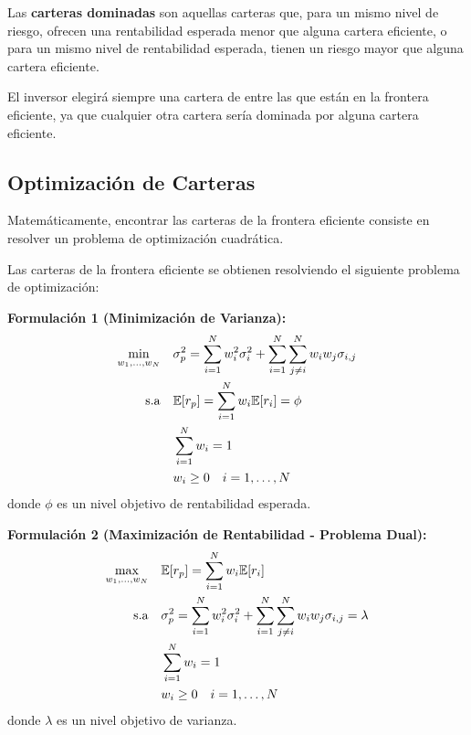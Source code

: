\begin{definicion}
Las \textbf{carteras dominadas} son aquellas carteras que, para un mismo nivel de riesgo, ofrecen una rentabilidad esperada menor que alguna cartera eficiente, o para un mismo nivel de rentabilidad esperada, tienen un riesgo mayor que alguna cartera eficiente.
\end{definicion}

El inversor elegirá siempre una cartera de entre las que están en la frontera eficiente, ya que cualquier otra cartera sería dominada por alguna cartera eficiente.

\subsection{Optimización de Carteras}

Matemáticamente, encontrar las carteras de la frontera eficiente consiste en resolver un problema de optimización cuadrática.

\begin{teorema}
Las carteras de la frontera eficiente se obtienen resolviendo el siguiente problema de optimización:

\textbf{Formulación 1 (Minimización de Varianza):}
\begin{align}
\min_{w_1, \ldots, w_N} \quad & \sigma_p^2 = \sum_{i=1}^{N} w_i^2 \sigma_i^2 + \sum_{i=1}^{N} \sum_{j \neq i}^{N} w_i w_j \sigma_{i,j} \\
\text{s.a} \quad & \mathbb{E}[r_p] = \sum_{i=1}^{N} w_i \mathbb{E}[r_i] = \phi \\
& \sum_{i=1}^{N} w_i = 1 \\
& w_i \geq 0 \quad i = 1, \ldots, N
\end{align}
donde $\phi$ es un nivel objetivo de rentabilidad esperada.

\textbf{Formulación 2 (Maximización de Rentabilidad - Problema Dual):}
\begin{align}
\max_{w_1, \ldots, w_N} \quad & \mathbb{E}[r_p] = \sum_{i=1}^{N} w_i \mathbb{E}[r_i] \\
\text{s.a} \quad & \sigma_p^2 = \sum_{i=1}^{N} w_i^2 \sigma_i^2 + \sum_{i=1}^{N} \sum_{j \neq i}^{N} w_i w_j \sigma_{i,j} = \lambda \\
& \sum_{i=1}^{N} w_i = 1 \\
& w_i \geq 0 \quad i = 1, \ldots, N
\end{align}
donde $\lambda$ es un nivel objetivo de varianza.
\end{teorema}

